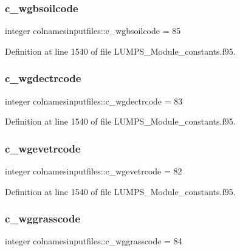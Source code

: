 \subsubsection{\texorpdfstring{c\+\_\+wgbsoilcode}{c\_wgbsoilcode}}
{\footnotesize\ttfamily integer colnamesinputfiles\+::c\+\_\+wgbsoilcode = 85}



Definition at line 1540 of file L\+U\+M\+P\+S\+\_\+\+Module\+\_\+constants.\+f95.

\mbox{\label{namespacecolnamesinputfiles_a89c3978f772cf69717e7c3805a77546e}} 
\subsubsection{\texorpdfstring{c\+\_\+wgdectrcode}{c\_wgdectrcode}}
{\footnotesize\ttfamily integer colnamesinputfiles\+::c\+\_\+wgdectrcode = 83}



Definition at line 1540 of file L\+U\+M\+P\+S\+\_\+\+Module\+\_\+constants.\+f95.

\mbox{\label{namespacecolnamesinputfiles_acd1aae2c74f1010dc8e96721d060ee2f}} 
\subsubsection{\texorpdfstring{c\+\_\+wgevetrcode}{c\_wgevetrcode}}
{\footnotesize\ttfamily integer colnamesinputfiles\+::c\+\_\+wgevetrcode = 82}



Definition at line 1540 of file L\+U\+M\+P\+S\+\_\+\+Module\+\_\+constants.\+f95.

\mbox{\label{namespacecolnamesinputfiles_ac42a1208e0193748f986358d69a536db}} 
\subsubsection{\texorpdfstring{c\+\_\+wggrasscode}{c\_wggrasscode}}
{\footnotesize\ttfamily integer colnamesinputfiles\+::c\+\_\+wggrasscode = 84}



